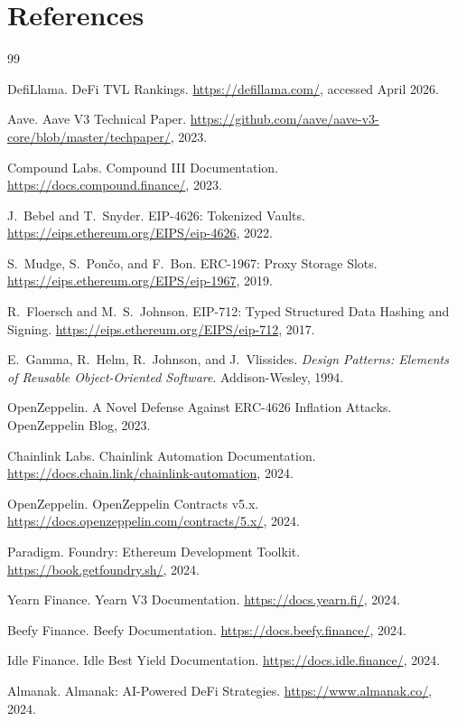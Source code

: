 \documentclass[12pt]{article}
\begin{document}
\section*{References}
\begin{thebibliography}{99}

DefiLlama.
\newblock DeFi TVL Rankings.
\newblock \url{https://defillama.com/}, accessed April 2026.

Aave.
\newblock Aave V3 Technical Paper.
\newblock \url{https://github.com/aave/aave-v3-core/blob/master/techpaper/}, 2023.

Compound Labs.
\newblock Compound III Documentation.
\newblock \url{https://docs.compound.finance/}, 2023.

J.~Bebel and T.~Snyder.
\newblock EIP-4626: Tokenized Vaults.
\newblock \url{https://eips.ethereum.org/EIPS/eip-4626}, 2022.

S.~Mudge, S.~Pon\v{c}o, and F.~Bon.
\newblock ERC-1967: Proxy Storage Slots.
\newblock \url{https://eips.ethereum.org/EIPS/eip-1967}, 2019.

R.~Floersch and M.~S.~Johnson.
\newblock EIP-712: Typed Structured Data Hashing and Signing.
\newblock \url{https://eips.ethereum.org/EIPS/eip-712}, 2017.

E.~Gamma, R.~Helm, R.~Johnson, and J.~Vlissides.
\newblock \emph{Design Patterns: Elements of Reusable Object-Oriented Software}.
\newblock Addison-Wesley, 1994.

OpenZeppelin.
\newblock A Novel Defense Against ERC-4626 Inflation Attacks.
\newblock OpenZeppelin Blog, 2023.

Chainlink Labs.
\newblock Chainlink Automation Documentation.
\newblock \url{https://docs.chain.link/chainlink-automation}, 2024.

OpenZeppelin.
\newblock OpenZeppelin Contracts v5.x.
\newblock \url{https://docs.openzeppelin.com/contracts/5.x/}, 2024.

Paradigm.
\newblock Foundry: Ethereum Development Toolkit.
\newblock \url{https://book.getfoundry.sh/}, 2024.

Yearn Finance.
\newblock Yearn V3 Documentation.
\newblock \url{https://docs.yearn.fi/}, 2024.

Beefy Finance.
\newblock Beefy Documentation.
\newblock \url{https://docs.beefy.finance/}, 2024.

Idle Finance.
\newblock Idle Best Yield Documentation.
\newblock \url{https://docs.idle.finance/}, 2024.

Almanak.
\newblock Almanak: AI-Powered DeFi Strategies.
\newblock \url{https://www.almanak.co/}, 2024.

\end{thebibliography}
\endgroup
\end{document}
